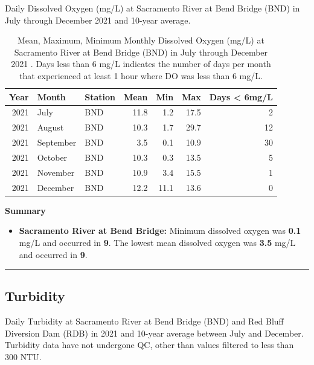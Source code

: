 \documentclass[
]{book}
\providecommand{\tightlist}{%
  \setlength{\itemsep}{0pt}\setlength{\parskip}{0pt}}
\theoremstyle{definition}
\theoremstyle{definition}
\theoremstyle{definition}
\theoremstyle{definition}
\theoremstyle{remark}
\begin{document}
\label{fig:doBNDjuv-fig}Daily Dissolved Oxygen (mg/L) at Sacramento River at Bend Bridge (BND) in July through December 2021 and 10-year average.

\begin{table}
\centering
\caption{Mean, Maximum, Minimum Monthly Dissolved Oxygen (mg/L) at Sacramento River at Bend Bridge (BND) in July through December 2021 . Days less than 6 mg/L indicates the number of days per month that experienced at least 1 hour where DO was less than 6 mg/L.}
\centering
\begin{tabular}[t]{rllrrrr}
\hline
Year & Month & Station & Mean & Min & Max & Days < 6mg/L\\
\hline
2021 & July & BND & 11.8 & 1.2 & 17.5 & 2\\
\hline
2021 & August & BND & 10.3 & 1.7 & 29.7 & 12\\
\hline
2021 & September & BND & 3.5 & 0.1 & 10.9 & 30\\
\hline
2021 & October & BND & 10.3 & 0.3 & 13.5 & 5\\
\hline
2021 & November & BND & 10.9 & 3.4 & 15.5 & 1\\
\hline
2021 & December & BND & 12.2 & 11.1 & 13.6 & 0\\
\hline
\end{tabular}
\end{table}

\textbf{Summary}

\begin{itemize}
\tightlist
\item
  \textbf{Sacramento River at Bend Bridge:} Minimum dissolved oxygen was \textbf{0.1} mg/L and occurred in \textbf{9}. The lowest mean dissolved oxygen was \textbf{3.5} mg/L and occurred in \textbf{9}.
\end{itemize}

\begin{center}\rule{0.5\linewidth}{0.5pt}\end{center}

\hypertarget{turbidity}{%
\subsection{Turbidity}\label{turbidity}}

\label{fig:TurbBNDRDB-fig}Daily Turbidity at Sacramento River at Bend Bridge (BND) and Red Bluff Diversion Dam (RDB) in 2021 and 10-year average between July and December. Turbidity data have not undergone QC, other than values filtered to less than 300 NTU.
\end{document}
